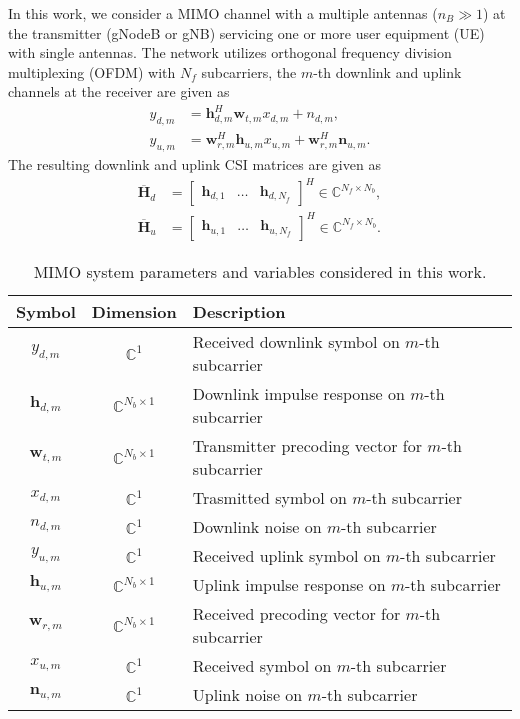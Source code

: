 In this work, we consider a MIMO channel with a multiple antennas ($n_B \gg 1$) at the transmitter (gNodeB or gNB) servicing one or more user equipment (UE) with single antennas. The network utilizes orthogonal frequency division multiplexing (OFDM) with $N_f$ subcarriers, the $m$-th downlink and uplink channels at the receiver are given as
\begin{align*}
	y_{d,m} &= \mathbf h_{d,m}^H\mathbf w_{t,m}x_{d,m} + n_{d,m}, \\
	y_{u,m} &= \mathbf w_{r,m}^H\mathbf h_{u,m}x_{u,m} + \mathbf w_{r,m}^H\mathbf n_{u,m}.
\end{align*}
The resulting downlink and uplink CSI matrices are given as
\begin{align*} 
\overline{\mathbf H}_d &= \begin{bmatrix} \mathbf h_{d,1} & \dots & \mathbf h_{d,N_f}\end{bmatrix}^H \in \mathbb C^{N_f \times N_b}, \\
\overline{\mathbf H}_u &= \begin{bmatrix} \mathbf h_{u,1} & \dots & \mathbf h_{u,N_f}\end{bmatrix}^H \in \mathbb C^{N_f \times N_b}.
\end{align*}
\begin{table}[]
\centering
\caption{MIMO system parameters and variables considered in this work.}
\label{tab:cost-params}
\begin{tabular}{c|c|l}
\toprule
\textbf{Symbol}   & \textbf{Dimension}          & \textbf{Description} \\ \midrule
$y_{d,m}$ 		  & $\mathbb{C}^{1}$ 			& Received downlink symbol on $m$-th subcarrier  \\ \hline
$\mathbf h_{d,m}$ & $\mathbb{C}^{N_b \times 1}$ & Downlink impulse response on $m$-th subcarrier  \\ \hline
$\mathbf w_{t,m}$ & $\mathbb{C}^{N_b \times 1}$ & Transmitter precoding vector for $m$-th subcarrier  \\ \hline
$x_{d,m}$ 		  & $\mathbb{C}^{1}$ 			& Trasmitted symbol on $m$-th subcarrier  \\ \hline
$n_{d,m}$ 		  & $\mathbb{C}^{1}$ 			& Downlink noise on $m$-th subcarrier  \\ \hline
$y_{u,m}$ 		  & $\mathbb{C}^{1}$ 			& Received uplink symbol on $m$-th subcarrier  \\ \hline
$\mathbf h_{u,m}$ & $\mathbb{C}^{N_b \times 1}$ & Uplink impulse response on $m$-th subcarrier  \\ \hline
$\mathbf w_{r,m}$ & $\mathbb{C}^{N_b \times 1}$ & Received precoding vector for $m$-th subcarrier  \\ \hline
$x_{u,m}$ 		  & $\mathbb{C}^{1}$ 			& Received symbol on $m$-th subcarrier  \\ \hline
$\mathbf n_{u,m}$ & $\mathbb{C}^{1}$ 			& Uplink noise on $m$-th subcarrier  \\ \hline
\end{tabular}
\end{table}

